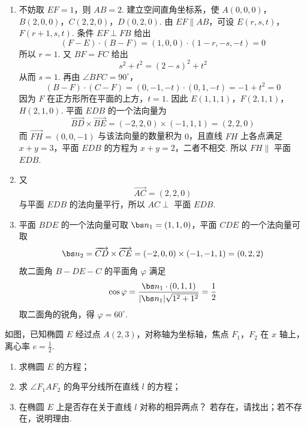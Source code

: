 \begin{solution}
\begin{enumerate}
\item 不妨取 \(EF=1\)，则 \(AB=2\). 建立空间直角坐标系，使
\(A(0,0,0)\)，\(B(2,0,0)\)，\(C(2,2,0)\)，\(D(0,2,0)\).
由 \(EF\parallel AB\)，可设 \(E(r,s,t)\)，\(F(r+1,s,t)\). 条件 \(EF\perp FB\) 给出
\[
(F-E)\cdot(B-F)=(1,0,0)\cdot(1-r,-s,-t)=0
\]
所以 \(r=1\). 又 \(BF=FC\) 给出
\[
s^2+t^2=(2-s)^2+t^2
\]
从而 \(s=1\). 再由 \(\angle BFC=90^\circ\)，
\[
(B-F)\cdot(C-F)=(0,-1,-t)\cdot(0,1,-t)=-1+t^2=0
\]
因为 \(F\) 在正方形所在平面的上方，\(t=1\). 因此
\(E(1,1,1)\)，\(F(2,1,1)\)，\(H(2,1,0)\).
平面 \(EDB\) 的一个法向量为
\[
\overrightarrow{BD}\times\overrightarrow{BE}
=(-2,2,0)\times(-1,1,1)=(2,2,0)
\]
而 \(\overrightarrow{FH}=(0,0,-1)\) 与该法向量的数量积为 \(0\)，且直线 \(FH\) 上各点满足 \(x+y=3\)，平面 \(EDB\) 的方程为 \(x+y=2\)，二者不相交. 所以 \(FH\parallel\) 平面 \(EDB\).
\item 又
\[
\overrightarrow{AC}=(2,2,0)
\]
与平面 \(EDB\) 的法向量平行，所以 \(AC\perp\) 平面 \(EDB\).
\item 平面 \(BDE\) 的一个法向量可取 \(\bs n_1=(1,1,0)\)，平面 \(CDE\) 的一个法向量可取
\[
\bs n_2=\overrightarrow{CD}\times\overrightarrow{CE}
=(-2,0,0)\times(-1,-1,1)=(0,2,2)
\]
故二面角 \(B-DE-C\) 的平面角 \(\varphi\) 满足
\[
\cos\varphi=\frac{\bs n_1\cdot(0,1,1)}
{|\bs n_1|\sqrt{1^2+1^2}}
=\frac{1}{2}
\]
取二面角的锐角，得 \(\varphi=60^\circ\).
\end{enumerate}
\end{solution}

\begin{problem}
如图，已知椭圆 \(E\) 经过点 \(A(2,3)\)，对称轴为坐标轴，焦点 \(F_{1}\)，\(F_{2}\) 在 \(x\) 轴上，离心率 \(e = \frac{1}{2}\).

\begin{enumerate}
\item 求椭圆 \(E\) 的方程；
\item 求 \(\angle F_{1}AF_{2}\) 的角平分线所在直线 \(l\) 的方程；
\item 在椭圆 \(E\) 上是否存在关于直线 \(l\) 对称的相异两点？ 若存在，请找出；若不存在，说明理由.
\end{enumerate}

\end{problem}

